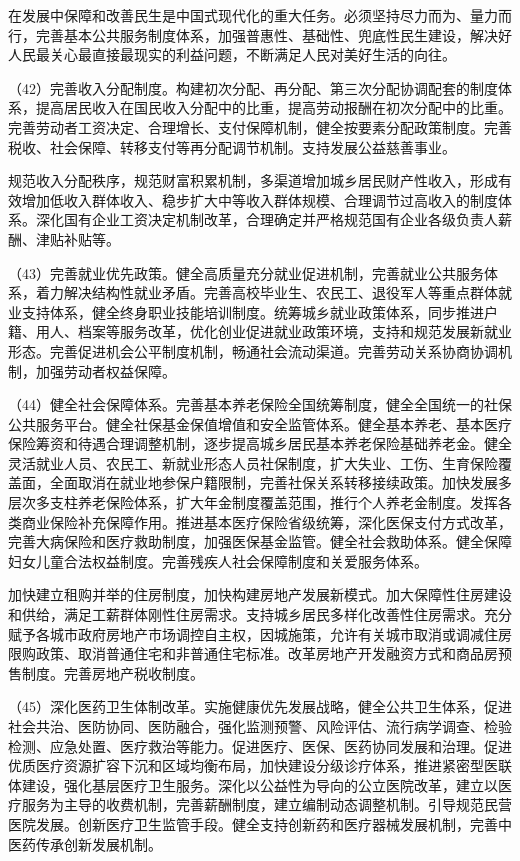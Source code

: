     在发展中保障和改善民生是中国式现代化的重大任务。必须坚持尽力而为、量力而行，完善基本公共服务制度体系，加强普惠性、基础性、兜底性民生建设，解决好人民最关心最直接最现实的利益问题，不断满足人民对美好生活的向往。

    （42）完善收入分配制度。构建初次分配、再分配、第三次分配协调配套的制度体系，提高居民收入在国民收入分配中的比重，提高劳动报酬在初次分配中的比重。完善劳动者工资决定、合理增长、支付保障机制，健全按要素分配政策制度。完善税收、社会保障、转移支付等再分配调节机制。支持发展公益慈善事业。

    规范收入分配秩序，规范财富积累机制，多渠道增加城乡居民财产性收入，形成有效增加低收入群体收入、稳步扩大中等收入群体规模、合理调节过高收入的制度体系。深化国有企业工资决定机制改革，合理确定并严格规范国有企业各级负责人薪酬、津贴补贴等。

    （43）完善就业优先政策。健全高质量充分就业促进机制，完善就业公共服务体系，着力解决结构性就业矛盾。完善高校毕业生、农民工、退役军人等重点群体就业支持体系，健全终身职业技能培训制度。统筹城乡就业政策体系，同步推进户籍、用人、档案等服务改革，优化创业促进就业政策环境，支持和规范发展新就业形态。完善促进机会公平制度机制，畅通社会流动渠道。完善劳动关系协商协调机制，加强劳动者权益保障。

    （44）健全社会保障体系。完善基本养老保险全国统筹制度，健全全国统一的社保公共服务平台。健全社保基金保值增值和安全监管体系。健全基本养老、基本医疗保险筹资和待遇合理调整机制，逐步提高城乡居民基本养老保险基础养老金。健全灵活就业人员、农民工、新就业形态人员社保制度，扩大失业、工伤、生育保险覆盖面，全面取消在就业地参保户籍限制，完善社保关系转移接续政策。加快发展多层次多支柱养老保险体系，扩大年金制度覆盖范围，推行个人养老金制度。发挥各类商业保险补充保障作用。推进基本医疗保险省级统筹，深化医保支付方式改革，完善大病保险和医疗救助制度，加强医保基金监管。健全社会救助体系。健全保障妇女儿童合法权益制度。完善残疾人社会保障制度和关爱服务体系。

    加快建立租购并举的住房制度，加快构建房地产发展新模式。加大保障性住房建设和供给，满足工薪群体刚性住房需求。支持城乡居民多样化改善性住房需求。充分赋予各城市政府房地产市场调控自主权，因城施策，允许有关城市取消或调减住房限购政策、取消普通住宅和非普通住宅标准。改革房地产开发融资方式和商品房预售制度。完善房地产税收制度。

    （45）深化医药卫生体制改革。实施健康优先发展战略，健全公共卫生体系，促进社会共治、医防协同、医防融合，强化监测预警、风险评估、流行病学调查、检验检测、应急处置、医疗救治等能力。促进医疗、医保、医药协同发展和治理。促进优质医疗资源扩容下沉和区域均衡布局，加快建设分级诊疗体系，推进紧密型医联体建设，强化基层医疗卫生服务。深化以公益性为导向的公立医院改革，建立以医疗服务为主导的收费机制，完善薪酬制度，建立编制动态调整机制。引导规范民营医院发展。创新医疗卫生监管手段。健全支持创新药和医疗器械发展机制，完善中医药传承创新发展机制。

